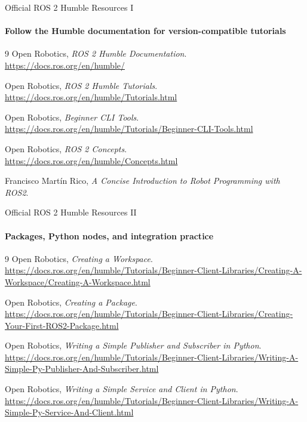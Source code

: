 \begin{frame}{Official ROS 2 Humble Resources I}
\framesubtitle{Follow the Humble documentation for version-compatible tutorials}
\scriptsize
\begin{thebibliography}{9}
Open Robotics, \emph{ROS 2 Humble Documentation}.\\
\url{https://docs.ros.org/en/humble/}

Open Robotics, \emph{ROS 2 Humble Tutorials}.\\
\url{https://docs.ros.org/en/humble/Tutorials.html}

Open Robotics, \emph{Beginner CLI Tools}.\\
\url{https://docs.ros.org/en/humble/Tutorials/Beginner-CLI-Tools.html}

Open Robotics, \emph{ROS 2 Concepts}.\\
\url{https://docs.ros.org/en/humble/Concepts.html}

Francisco Martín Rico, \emph{A Concise Introduction to Robot Programming with ROS2}.
\end{thebibliography}
\end{frame}

\begin{frame}{Official ROS 2 Humble Resources II}
\framesubtitle{Packages, Python nodes, and integration practice}
\scriptsize
\begin{thebibliography}{9}
Open Robotics, \emph{Creating a Workspace}.\\
\url{https://docs.ros.org/en/humble/Tutorials/Beginner-Client-Libraries/Creating-A-Workspace/Creating-A-Workspace.html}

Open Robotics, \emph{Creating a Package}.\\
\url{https://docs.ros.org/en/humble/Tutorials/Beginner-Client-Libraries/Creating-Your-First-ROS2-Package.html}

Open Robotics, \emph{Writing a Simple Publisher and Subscriber in Python}.\\
\url{https://docs.ros.org/en/humble/Tutorials/Beginner-Client-Libraries/Writing-A-Simple-Py-Publisher-And-Subscriber.html}

Open Robotics, \emph{Writing a Simple Service and Client in Python}.\\
\url{https://docs.ros.org/en/humble/Tutorials/Beginner-Client-Libraries/Writing-A-Simple-Py-Service-And-Client.html}
\end{thebibliography}
\end{frame}